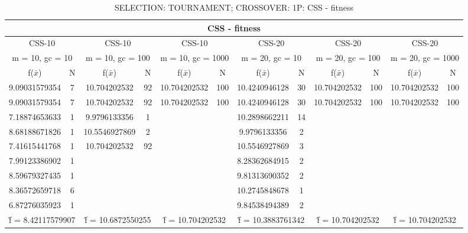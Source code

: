 \begin{table}[H]
	\centering
	\caption{SELECTION: TOURNAMENT; CROSSOVER: 1P: CSS - fitness}
	\begin{adjustbox}{width=1\textwidth}
		\begin{tabular}{ |c|c||c|c||c|c||c|c||c|c||c|c| }
			\hline
			\multicolumn{12}{|c|}{CSS - fitness} \\
			\hline
			\multicolumn{2}{|c||}{CSS-10} & \multicolumn{2}{c||}{CSS-10} & \multicolumn{2}{c||}{CSS-10} & \multicolumn{2}{c||}{CSS-20} & \multicolumn{2}{c||}{CSS-20} & \multicolumn{2}{c|}{CSS-20}\\
			\hline
			\multicolumn{2}{|c||}{m = 10, gc = 10} & \multicolumn{2}{c||}{m = 10, gc = 100} & \multicolumn{2}{c||}{m = 10, gc = 1000} & \multicolumn{2}{c||}{m = 20, gc = 10} & \multicolumn{2}{c||}{m = 20, gc = 100} & \multicolumn{2}{c|}{m = 20, gc = 1000}\\
			\hline
			f($\bar{x}$) & N & f($\bar{x}$) & N & f($\bar{x}$) & N & f($\bar{x}$) & N & f($\bar{x}$) & N & f($\bar{x}$) & N\\
			\hline
			\hline
			9.09031579354 & 7 & 10.704202532 & 92 & 10.704202532 & 100 & 10.4240946128 & 30 & 10.704202532 & 100 & 10.704202532 & 100\\
			\hline
			9.09031579354 & 7 & 10.704202532 & 92 & 10.704202532 & 100 & 10.4240946128 & 30 & 10.704202532 & 100 & 10.704202532 & 100\\
			7.18874653633 & 1 & 9.9796133356 & 1 &   &   & 10.2898662211 & 14 &   &   &   &  \\
			8.68188671826 & 1 & 10.5546927869 & 2 &   &   & 9.9796133356 & 2 &   &   &   &  \\
			7.41615441768 & 1 & 10.704202532 & 92 &   &   & 10.5546927869 & 3 &   &   &   &  \\
			7.99123386902 & 1 &   &   &   &   & 8.28362684915 & 2 &   &   &   &  \\
			8.59679327435 & 1 &   &   &   &   & 9.81313690352 & 2 &   &   &   &  \\
			8.36572659718 & 6 &   &   &   &   & 10.2745848678 & 1 &   &   &   &  \\
			6.87276035923 & 1 &   &   &   &   & 9.84538494389 & 2 &   &   &   &  \\
			\hline
			\multicolumn{2}{|c||}{\^{f} = 8.42117579907} & \multicolumn{2}{c||}{\^{f} = 10.6872550255} & \multicolumn{2}{c||}{\^{f} = 10.704202532} & \multicolumn{2}{c||}{\^{f} = 10.3883761342} & \multicolumn{2}{c||}{\^{f} = 10.704202532} & \multicolumn{2}{c|}{\^{f} = 10.704202532}\\
			\hline
		\end{tabular}
	\end{adjustbox}
\end{table}
